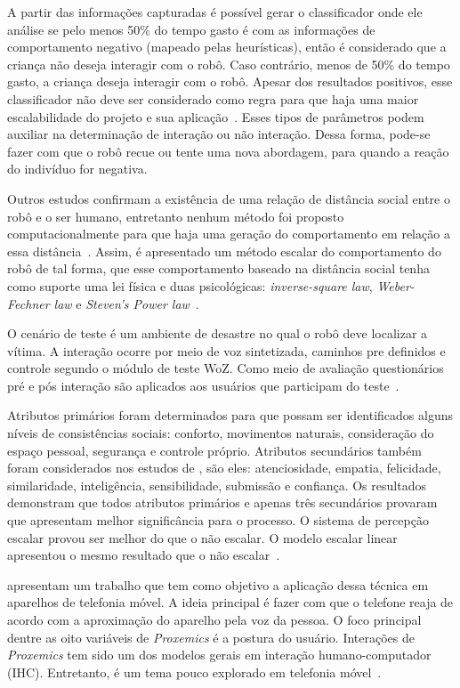 A partir das informações capturadas é possível gerar o classificador onde ele análise se pelo menos 50\% do tempo gasto é com as informações de comportamento negativo (mapeado pelas heurísticas), então é considerado que a criança não deseja interagir com o robô. Caso contrário, menos de 50\% do tempo gasto, a criança deseja interagir com o robô. Apesar dos resultados positivos, esse classificador não deve ser considerado como regra para que haja uma maior escalabilidade do projeto e sua aplicação~\cite{Feil-Seifer:2010}. Esses tipos de parâmetros podem auxiliar na determinação de interação ou não interação. Dessa forma, pode-se fazer com que o robô recue ou tente uma nova abordagem, para quando a reação do indivíduo for negativa.

Outros estudos confirmam a existência de uma relação de distância social entre o robô e o ser humano, entretanto nenhum método foi proposto computacionalmente para que haja uma geração do comportamento em relação a essa distância~\cite{Henkel:2012b}. Assim, é apresentado um método escalar do comportamento do robô de tal forma, que esse comportamento baseado na distância social tenha como suporte uma lei física e duas psicológicas: \emph{inverse-square law}, \emph{Weber-Fechner law} e \emph{Steven's Power law}~\cite{Henkel:2012b}.

O cenário de teste é um ambiente de desastre no qual o robô deve localizar a vítima. A interação ocorre por meio de voz sintetizada, caminhos pre definidos e controle segundo o módulo de teste WoZ. Como meio de avaliação questionários pré e pós interação são aplicados aos usuários que participam do teste~\cite{Henkel:2012b}.

Atributos primários foram determinados para que possam ser identificados alguns níveis de consistências sociais: conforto, movimentos naturais, consideração do espaço pessoal, segurança e controle próprio. Atributos secundários também foram considerados nos estudos de , são eles: atenciosidade, empatia, felicidade, similaridade, inteligência, sensibilidade, submissão e confiança. Os resultados demonstram que todos atributos primários e apenas três secundários provaram que apresentam melhor significância para o processo. O sistema de percepção escalar provou ser melhor do que o não escalar. O modelo escalar linear apresentou o mesmo resultado que o não escalar~\cite{Henkel:2012b}.

 apresentam um trabalho que tem como objetivo a aplicação dessa técnica em aparelhos de telefonia móvel. A ideia principal é fazer com que o telefone reaja de acordo com a aproximação do aparelho pela voz da pessoa. O foco principal dentre as oito variáveis de \emph{Proxemics} é a postura do usuário. Interações de \emph{Proxemics} tem sido um dos modelos gerais em interação humano-computador (IHC). Entretanto, é um tema pouco explorado em telefonia móvel~\cite{Hemmert:2013}.

